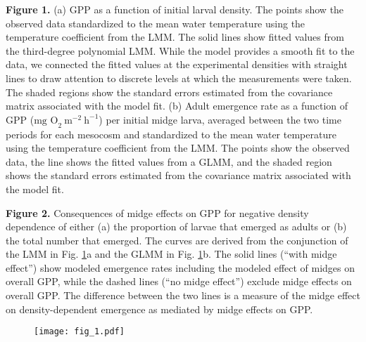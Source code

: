 \documentclass[12pt]{article}
\begin{document}
\textbf{Figure 1.}
(a) GPP as a function of initial larval density.
The points show the observed data standardized to the mean water temperature 
using the temperature coefficient from the LMM.
The solid lines show fitted values from the third-degree polynomial LMM.
While the model provides a smooth fit to the data,
we connected the fitted values at the experimental densities with
straight lines to draw attention to discrete levels at which the measurements were taken. 
The shaded regions show the standard errors estimated from the 
covariance matrix associated with the model fit.
(b) Adult emergence rate as a function of GPP ($\text{mg O}_2~\text{m}^{-2}~\text{h}^{-1}$) 
per initial midge larva, 
averaged between the two time periods for each mesocosm 
and standardized to the mean water temperature 
using the temperature coefficient from the LMM.
The points show the observed data, 
the line shows the fitted values from a GLMM,
and the shaded region shows the standard errors estimated from the 
covariance matrix associated with the model fit.


\textbf{Figure 2.}
Consequences of midge effects on GPP for negative density dependence of 
either (a) the proportion of larvae that emerged as adults or 
(b) the total number that emerged.
The curves are derived from the conjunction of the LMM in Fig. \ref{fig:comb}a
and the GLMM in Fig. \ref{fig:comb}b. 
The solid lines (``with midge effect'') show modeled emergence rates including the modeled
effect of midges on overall GPP,
while the dashed lines (``no midge effect'') exclude midge effects on overall GPP.
The difference between the two lines is a measure of the midge effect on density-dependent
emergence as mediated by midge effects on GPP. 



\begin{figure}
\centering
\linespread{1}
\texttt{[image: fig\_1.pdf]}
\caption{\label{fig:comb}
}
\end{figure}
\end{document}
